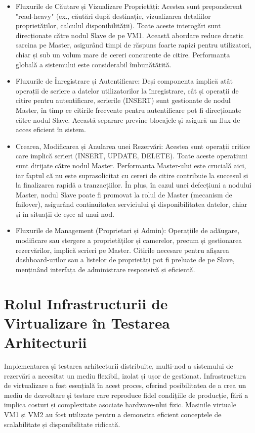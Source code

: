 \documentclass[12pt, a4paper, oneside, romanian]{teza-upb}
\begin{document}
\begin{itemize}
	\item Fluxurile de Căutare și Vizualizare Proprietăți: Acestea sunt preponderent "read-heavy" (ex., căutări după destinație, vizualizarea detaliilor proprietăților, calculul disponibilității). Toate aceste interogări sunt direcționate către nodul Slave de pe VM1. Această abordare reduce drastic sarcina pe Master, asigurând timpi de răspuns foarte rapizi pentru utilizatori, chiar și sub un volum mare de cereri concurente de citire. Performanța globală a sistemului este considerabil îmbunătățită.
	\item Fluxurile de Înregistrare și Autentificare: Deși componenta implică atât operații de scriere a datelor utilizatorilor la înregistrare, cât și operații de citire pentru autentificare, scrierile (INSERT) sunt gestionate de nodul Master, în timp ce citirile frecvente pentru autentificare pot fi direcționate către nodul Slave. Această separare previne blocajele și asigură un flux de acces eficient în sistem.
	\item Crearea, Modificarea și Anularea unei Rezervări: Acestea sunt operații critice care implică scrieri (INSERT, UPDATE, DELETE). Toate aceste operațiuni sunt dirijate către nodul Master. Performanța Master-ului este crucială aici, iar faptul că nu este suprasolicitat cu cereri de citire contribuie la succesul și la finalizarea rapidă a tranzacțiilor. În plus, în cazul unei defecțiuni a nodului Master, nodul Slave poate fi promovat la rolul de Master (mecanism de failover), asigurând continuitatea serviciului și disponibilitatea datelor, chiar și în situații de eșec al unui nod.
	\item Fluxurile de Management (Proprietari și Admin): Operațiile de adăugare, modificare sau ștergere a proprietăților și camerelor, precum și gestionarea rezervărilor, implică scrieri pe Master. Citirile necesare pentru afișarea dashboard-urilor sau a listelor de proprietăți pot fi preluate de pe Slave, menținând interfața de administrare responsivă și eficientă.
\end{itemize}




\section{Rolul Infrastructurii de Virtualizare în Testarea Arhitecturii}
Implementarea și testarea arhitecturii distribuite, multi-nod a sistemului de rezervări a necesitat un mediu flexibil, izolat și ușor de gestionat. Infrastructura de virtualizare a fost esențială în acest proces, oferind posibilitatea de a crea un mediu de dezvoltare și testare care reproduce fidel condițiile de producție, fără a implica costuri și complexitate asociate hardware-ului fizic. Mașinile virtuale VM1 și VM2 au fost utilizate pentru a demonstra eficient conceptele de scalabilitate și disponibilitate ridicată.
\end{document}
